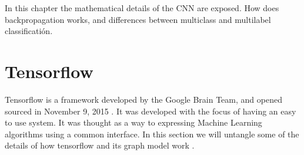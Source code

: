 In this chapter the mathematical details of the CNN are exposed. How does backpropagation works, and differences between multiclass and multilabel classificatión.

\section{Tensorflow}

Tensorflow is a framework developed by the Google Brain Team, and opened sourced in November 9, 2015 \cite{tensorflow2015-whitepaper}. It was developed with the focus of having an easy to use system. It was thought as a way to expressing Machine Learning algorithms using a common interface. In this section we will untangle some of the details of how tensorflow and its graph model work \cite{DBLP:journals/corr/AbadiBCCDDDGIIK16}.